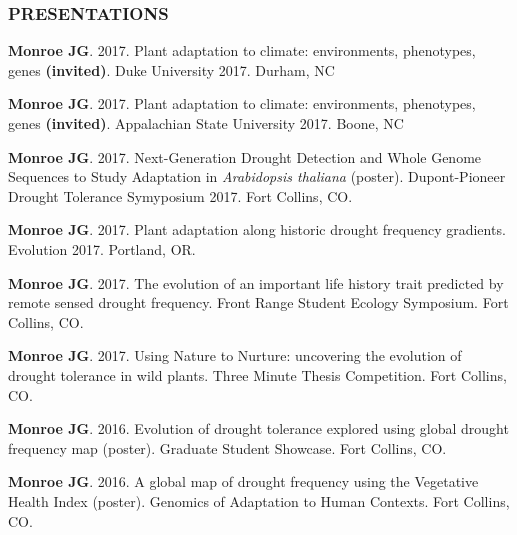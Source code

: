 \documentclass[12pt,english]{article}
\begin{document}
\subsubsection*{PRESENTATIONS}
\vspace{-0.5ex}
\begin{hangparas}{.5in}{1}
\hspace{1em}\textbf{Monroe JG}. 2017. Plant adaptation to climate: environments, phenotypes, genes \textbf{(invited)}. Duke University 2017. Durham, NC
\vspace{0.5ex}\par
\hspace{1em}\textbf{Monroe JG}. 2017. Plant adaptation to climate: environments, phenotypes, genes \textbf{(invited)}. Appalachian State University 2017. Boone, NC
\vspace{0.5ex}\par
\hspace{1em}\textbf{Monroe JG}. 2017. Next-Generation Drought Detection and Whole Genome Sequences to Study Adaptation in \textit{Arabidopsis thaliana} (poster). Dupont-Pioneer Drought Tolerance Symyposium 2017. Fort Collins, CO.
\vspace{0.5ex}\par
\hspace{1em}\textbf{Monroe JG}. 2017. Plant adaptation along historic drought frequency gradients. Evolution 2017. Portland, OR.
\vspace{0.5ex}\par
\hspace{1em}\textbf{Monroe JG}. 2017. The evolution of an important life history trait predicted by remote sensed drought frequency. Front Range Student Ecology Symposium. Fort Collins, CO.
\vspace{0.5ex}\par
\hspace{1em}\textbf{Monroe JG}. 2017. Using Nature to Nurture: uncovering the evolution of drought tolerance in wild plants. Three Minute Thesis Competition. Fort Collins, CO.
\vspace{0.5ex}\par
\hspace{1em}\textbf{Monroe JG}. 2016. Evolution of drought tolerance explored using global drought frequency map (poster). Graduate Student Showcase. Fort Collins, CO.
\vspace{0.5ex}\par
\hspace{1em}\textbf{Monroe JG}. 2016. A global map of drought frequency using the Vegetative Health Index (poster). Genomics of Adaptation to Human Contexts. Fort Collins, CO.

\end{hangparas}
\end{document}
